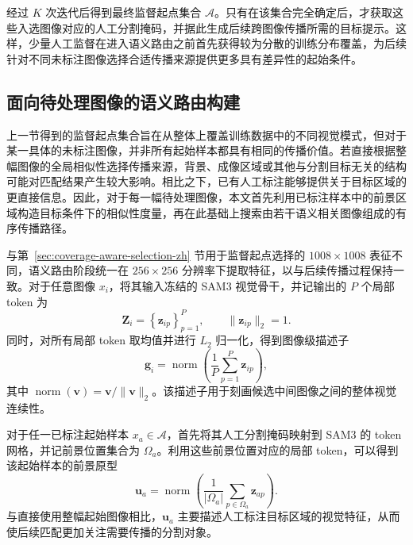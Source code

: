 \documentclass[UTF8,a4paper,10pt]{ctexart}
\begin{document}
经过 $K$ 次迭代后得到最终监督起点集合 $\mathcal{A}$。只有在该集合完全确定后，才获取这些入选图像对应的人工分割掩码，并据此生成后续跨图像传播所需的目标提示。这样，少量人工监督在进入语义路由之前首先获得较为分散的训练分布覆盖，为后续针对不同未标注图像选择合适传播来源提供更多具有差异性的起始条件。





\subsection{面向待处理图像的语义路由构建}
\label{sec:semantic-route-construction-zh}

上一节得到的监督起点集合旨在从整体上覆盖训练数据中的不同视觉模式，但对于某一具体的未标注图像，并非所有起始样本都具有相同的传播价值。若直接根据整幅图像的全局相似性选择传播来源，背景、成像区域或其他与分割目标无关的结构可能对匹配结果产生较大影响。相比之下，已有人工标注能够提供关于目标区域的更直接信息。因此，对于每一幅待处理图像，本文首先利用已标注样本中的前景区域构造目标条件下的相似性度量，再在此基础上搜索由若干语义相关图像组成的有序传播路径。

与第~\ref{sec:coverage-aware-selection-zh} 节用于监督起点选择的 $1008\times1008$ 表征不同，语义路由阶段统一在 $256\times256$ 分辨率下提取特征，以与后续传播过程保持一致。对于任意图像 $x_i$，将其输入冻结的 SAM3 视觉骨干，并记输出的 $P$ 个局部 token 为
\begin{equation}
\mathbf{Z}_i
=
\left\{
\mathbf{z}_{ip}
\right\}_{p=1}^{P},
\qquad
\|\mathbf{z}_{ip}\|_2=1.
\end{equation}
同时，对所有局部 token 取均值并进行 $L_2$ 归一化，得到图像级描述子
\begin{equation}
\mathbf{g}_i
=
\operatorname{norm}
\left(
\frac{1}{P}
\sum_{p=1}^{P}
\mathbf{z}_{ip}
\right),
\end{equation}
其中 $\operatorname{norm}(\mathbf{v})=\mathbf{v}/\|\mathbf{v}\|_2$。该描述子用于刻画候选中间图像之间的整体视觉连续性。

对于任一已标注起始样本 $x_a\in\mathcal{A}$，首先将其人工分割掩码映射到 SAM3 的 token 网格，并记前景位置集合为 $\Omega_a$。利用这些前景位置对应的局部 token，可以得到该起始样本的前景原型
\begin{equation}
\mathbf{u}_a
=
\operatorname{norm}
\left(
\frac{1}{|\Omega_a|}
\sum_{p\in\Omega_a}
\mathbf{z}_{ap}
\right).
\end{equation}
与直接使用整幅起始图像相比，$\mathbf{u}_a$ 主要描述人工标注目标区域的视觉特征，从而使后续匹配更加关注需要传播的分割对象。
\end{document}
